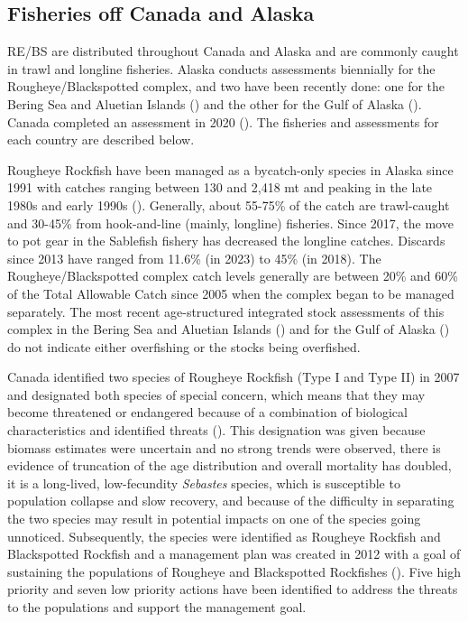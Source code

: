 \documentclass[
]{scrartcl}
\begin{document}
\subsection{Fisheries off Canada and
Alaska}\label{fisheries-off-canada-and-alaska}

RE/BS are distributed throughout Canada and Alaska and are commonly
caught in trawl and longline fisheries. Alaska conducts assessments
biennially for the Rougheye/Blackspotted complex, and two have been
recently done: one for the Bering Sea and Aluetian Islands
() and the other for the Gulf of Alaska
(). Canada
completed an assessment in 2020
().
The fisheries and assessments for each country are described below.

Rougheye Rockfish have been managed as a bycatch-only species in Alaska
since 1991 with catches ranging between 130 and 2,418 mt and peaking in
the late 1980s and early 1990s
().
Generally, about 55-75\% of the catch are trawl-caught and 30-45\% from
hook-and-line (mainly, longline) fisheries. Since 2017, the move to pot
gear in the Sablefish fishery has decreased the longline catches.
Discards since 2013 have ranged from 11.6\% (in 2023) to 45\% (in 2018).
The Rougheye/Blackspotted complex catch levels generally are between
20\% and 60\% of the Total Allowable Catch since 2005 when the complex
began to be managed separately. The most recent age-structured
integrated stock assessments of this complex in the Bering Sea and
Aluetian Islands () and for the Gulf of Alaska
() do not
indicate either overfishing or the stocks being overfished.

Canada identified two species of Rougheye Rockfish (Type I and Type II)
in 2007 and designated both species of special concern, which means that
they may become threatened or endangered because of a combination of
biological characteristics and identified threats
(). This designation was given
because biomass estimates were uncertain and no strong trends were
observed, there is evidence of truncation of the age distribution and
overall mortality has doubled, it is a long-lived, low-fecundity
\emph{Sebastes} species, which is susceptible to population collapse and
slow recovery, and because of the difficulty in separating the two
species may result in potential impacts on one of the species going
unnoticed. Subsequently, the species were identified as Rougheye
Rockfish and Blackspotted Rockfish and a management plan was created in
2012 with a goal of sustaining the populations of Rougheye and
Blackspotted Rockfishes
(). Five high priority and seven low priority actions have been
identified to address the threats to the populations and support the
management goal.
\end{document}
